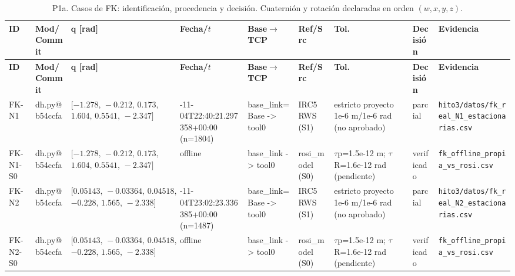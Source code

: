\begingroup
\scriptsize
\setlength{\tabcolsep}{2.5pt}
\renewcommand{\arraystretch}{1.12}
\begin{longtable}{>{\raggedright\arraybackslash}p{1.6cm}>{\raggedright\arraybackslash}p{2.0cm}>{\raggedright\arraybackslash}p{3.8cm}>{\raggedright\arraybackslash}p{3.0cm}>{\raggedright\arraybackslash}p{2.2cm}>{\raggedright\arraybackslash}p{3.4cm}>{\raggedright\arraybackslash}p{2.8cm}>{\raggedright\arraybackslash}p{1.6cm}>{\raggedright\arraybackslash}p{4.2cm}}
\caption{P1a. Casos de FK: identificación, procedencia y decisión. Cuaternión y rotación declaradas en orden $(w,x,y,z)$.}\label{tab:P1a}\\
\toprule
\textbf{ID} & \textbf{Mod/Commit} & \textbf{$\mathbf{q}$ [rad]} & \textbf{Fecha/$t$} & \textbf{Base$\to$TCP} & \textbf{Ref/Src} & \textbf{Tol.} & \textbf{Decisión} & \textbf{Evidencia} \\
\midrule
\endfirsthead
\toprule
\textbf{ID} & \textbf{Mod/Commit} & \textbf{$\mathbf{q}$ [rad]} & \textbf{Fecha/$t$} & \textbf{Base$\to$TCP} & \textbf{Ref/Src} & \textbf{Tol.} & \textbf{Decisión} & \textbf{Evidencia} \\
\midrule
\endhead
\bottomrule
\endfoot
FK-N1 & dh.py@b54ccfa & $[-1.278,\,-0.212,\,0.173,$\newline$1.604,\,0.5541,\,-2.347]$ & 2026-11-04T22:40:21.297358+00:00 (n=1804) & base\_link=Base -> tool0 & IRC5 RWS (S1) & estricto proyecto 1e-6 m/1e-6 rad (no aprobado) & parcial & \texttt{hito3/\allowbreak{}datos/\allowbreak{}fk\_\allowbreak{}real\_\allowbreak{}N1\_\allowbreak{}estacionarias.csv} \\
FK-N1-S0 & dh.py@b54ccfa & $[-1.278,\,-0.212,\,0.173,$\newline$1.604,\,0.5541,\,-2.347]$ & offline & base\_link -> tool0 & rosi\_model (S0) & $\tau$p=1.5e-12 m; $\tau$R=1.6e-12 rad (pendiente) & verificado & \texttt{fk\_\allowbreak{}offline\_\allowbreak{}propia\_\allowbreak{}vs\_\allowbreak{}rosi.csv} \\
FK-N2 & dh.py@b54ccfa & $[0.05143,\,-0.03364,\,0.04518,$\newline$-0.228,\,1.565,\,-2.338]$ & 2026-11-04T23:02:23.336385+00:00 (n=1487) & base\_link=Base -> tool0 & IRC5 RWS (S1) & estricto proyecto 1e-6 m/1e-6 rad (no aprobado) & parcial & \texttt{hito3/\allowbreak{}datos/\allowbreak{}fk\_\allowbreak{}real\_\allowbreak{}N2\_\allowbreak{}estacionarias.csv} \\
FK-N2-S0 & dh.py@b54ccfa & $[0.05143,\,-0.03364,\,0.04518,$\newline$-0.228,\,1.565,\,-2.338]$ & offline & base\_link -> tool0 & rosi\_model (S0) & $\tau$p=1.5e-12 m; $\tau$R=1.6e-12 rad (pendiente) & verificado & \texttt{fk\_\allowbreak{}offline\_\allowbreak{}propia\_\allowbreak{}vs\_\allowbreak{}rosi.csv} \\

\end{longtable}
